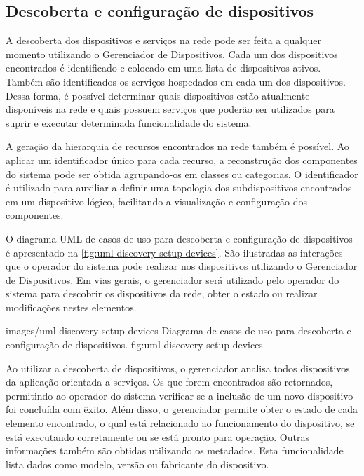 \subsection{Descoberta e configuração de dispositivos}
\label{sub:proposta-descoberta-configuracao-dispositivos}

A descoberta dos dispositivos e serviços na rede pode ser feita a qualquer momento utilizando o
Gerenciador de Dispositivos. Cada um dos dispositivos encontrados é identificado e colocado em uma
lista de dispositivos ativos. Também são identificados os serviços hospedados em cada um dos
dispositivos. Dessa forma, é possível determinar quais dispositivos estão atualmente disponíveis na
rede e quais possuem serviços que poderão ser utilizados para suprir e executar determinada
funcionalidade do sistema.

A geração da hierarquia de recursos encontrados na rede também é possível. Ao aplicar um
identificador único para cada recurso, a reconstrução dos componentes do sistema pode ser obtida
agrupando-os em classes ou categorias. O identificador é utilizado para auxiliar a definir uma
topologia dos subdispositivos encontrados em um dispositivo lógico, facilitando a visualização e
configuração dos componentes.

O diagrama \gls{UML} de casos de uso para descoberta e configuração de dispositivos é apresentado na
\cref{fig:uml-discovery-setup-devices}. São ilustradas as interações que o operador do sistema pode
realizar nos dispositivos utilizando o Gerenciador de Dispositivos. Em vias gerais, o gerenciador
será utilizado pelo operador do sistema para descobrir os dispositivos da rede, obter o estado ou
realizar modificações nestes elementos.

  {images/uml-discovery-setup-devices}
  {Diagrama de casos de uso para descoberta e configuração de dispositivos.}
  {fig:uml-discovery-setup-devices}

Ao utilizar a descoberta de dispositivos, o gerenciador analisa todos dispositivos da aplicação
orientada a serviços. Os que forem encontrados são retornados, permitindo ao operador do sistema
verificar se a inclusão de um novo dispositivo foi concluída com êxito. Além disso, o gerenciador
permite obter o estado de cada elemento encontrado, o qual está relacionado ao funcionamento do
dispositivo, se está executando corretamente ou se está pronto para operação. Outras informações
também são obtidas utilizando os metadados. Esta funcionalidade lista dados como modelo, versão ou
fabricante do dispositivo.

